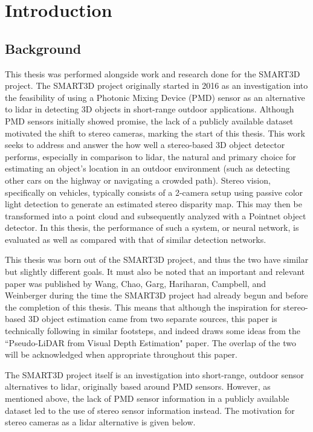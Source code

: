 \section{Introduction} %

\subsection{Background}
This thesis was performed alongside work and research done for the SMART3D project. The SMART3D project originally started in 2016 as an investigation into the feasibility of using a Photonic Mixing Device (PMD) sensor as an alternative to lidar in detecting 3D objects in short-range outdoor applications. Although PMD sensors initially showed promise, the lack of a publicly available dataset motivated the shift to stereo cameras, marking the start of this thesis. This work seeks to address and answer the how well a stereo-based 3D object detector performs, especially in comparison to lidar, the natural and primary choice for estimating an object's location in an outdoor environment (such as detecting other cars on the highway or navigating a crowded path). Stereo vision, specifically on vehicles, typically consists of a 2-camera setup using passive color light detection to generate an estimated stereo disparity map. This may then be transformed into a point cloud and subsequently analyzed with a Pointnet object detector. In this thesis, the performance of such a system, or neural network, is evaluated as well as compared with that of similar detection networks. 

This thesis was born out of the SMART3D project, and thus the two have similar but slightly different goals. It must also be noted that an important and relevant paper was published by Wang, Chao, Garg, Hariharan, Campbell, and Weinberger \cite{wang_pseudo-lidar_2019} during the time the SMART3D project had already begun and before the completion of this thesis. This means that although the inspiration for stereo-based 3D object estimation came from two separate sources, this paper is technically following in similar footsteps, and indeed draws some ideas from the ``Pseudo-LiDAR from Visual Depth Estimation" paper. The overlap of the two will be acknowledged when appropriate throughout this paper.

The SMART3D project itself is an investigation into short-range, outdoor sensor alternatives to lidar, originally based around PMD sensors. However, as mentioned above, the lack of PMD sensor information in a publicly available dataset led to the use of stereo sensor information instead. The motivation for stereo cameras as a lidar alternative is given below.

